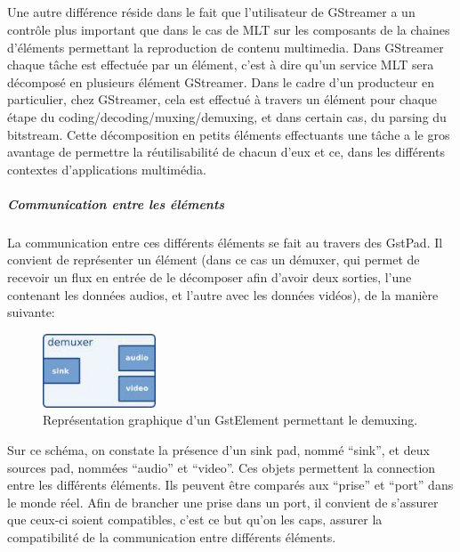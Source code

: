 {\subparagraph{}

Une autre différence réside dans le fait que l'utilisateur de
GStreamer a un contrôle plus important que dans le cas de MLT sur
les composants de la chaines d'éléments permettant la reproduction de
contenu multimedia.  Dans GStreamer chaque tâche est effectuée par un
élément, c'est à dire qu'un service MLT sera décomposé en plusieurs
élément GStreamer. Dans le cadre d'un producteur en particulier, chez
GStreamer, cela est effectué à travers un élément pour chaque étape
du coding/decoding/muxing/demuxing, et dans certain cas, du parsing du
bitstream. Cette décomposition en petits éléments effectuants une tâche
a le gros avantage de permettre la réutilisabilité de chacun d'eux et
ce, dans les différents  contextes d'applications multimédia.

\subparagraph{Communication entre les éléments}

\subparagraph{}

La communication entre ces différents éléments se fait au travers des
GstPad. Il convient de représenter un élément (dans ce cas un démuxer,
qui permet de recevoir un flux en entrée de le décomposer afin d'avoir
deux sorties, l'une contenant les données audios, et l'autre avec les
données vidéos), de la manière suivante:

\begin{figure} [H]

  \begin{center}

    \includegraphics[width=0.30\textwidth]{images/gstdemuxer}

  \end{center}

  \caption{Représentation graphique d'un GstElement permettant le
  demuxing.}

  \label{Yes}

\end{figure}

Sur ce schéma, on constate la présence d'un sink pad, nommé ``sink'',
et deux sources pad, nommées ``audio'' et ``video''. Ces objets permettent
la connection entre les différents éléments. Ils peuvent être comparés
aux ``prise'' et ``port'' dans le monde réel.  Afin de brancher une prise
dans un port, il convient de s'assurer que ceux-ci soient compatibles,
c'est ce but qu'on les caps, assurer la compatibilité de la communication
entre différents éléments.

}
